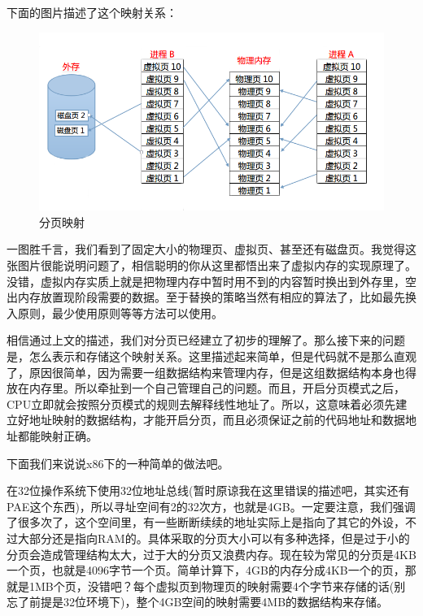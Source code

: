\par 下面的图片描述了这个映射关系：

\begin{figure}[ht]
      \centering
      \includegraphics[scale=0.35]{picture/chapt9/PAGE_MAP.png}
      \caption{分页映射}
\end{figure}

\par 一图胜千言，我们看到了固定大小的物理页、虚拟页、甚至还有磁盘页。我觉得这张图片很能说明问题了，相信聪明的你从这里都悟出来了虚拟内存的实现原理了。没错，虚拟内存实质上就是把物理内存中暂时用不到的内容暂时换出到外存里，空出内存放置现阶段需要的数据。至于替换的策略当然有相应的算法了，比如最先换入原则，最少使用原则等等方法可以使用。

\par 相信通过上文的描述，我们对分页已经建立了初步的理解了。那么接下来的问题是，怎么表示和存储这个映射关系。这里描述起来简单，但是代码就不是那么直观了，原因很简单，因为需要一组数据结构来管理内存，但是这组数据结构本身也得放在内存里。所以牵扯到一个自己管理自己的问题。而且，开启分页模式之后，CPU立即就会按照分页模式的规则去解释线性地址了。所以，这意味着必须先建立好地址映射的数据结构，才能开启分页，而且必须保证之前的代码地址和数据地址都能映射正确。

\par 下面我们来说说x86下的一种简单的做法吧。

\par 在32位操作系统下使用32位地址总线(暂时原谅我在这里错误的描述吧，其实还有PAE这个东西)，所以寻址空间有2的32次方，也就是4GB。一定要注意，我们强调了很多次了，这个空间里，有一些断断续续的地址实际上是指向了其它的外设，不过大部分还是指向RAM的。具体采取的分页大小可以有多种选择，但是过于小的分页会造成管理结构太大，过于大的分页又浪费内存。现在较为常见的分页是4KB一个页，也就是4096字节一个页。简单计算下，4GB的内存分成4KB一个的页，那就是1MB个页，没错吧？每个虚拟页到物理页的映射需要4个字节来存储的话(别忘了前提是32位环境下)，整个4GB空间的映射需要4MB的数据结构来存储。

